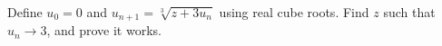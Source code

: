 Define $u_0=0$ and $u_{n+1}=\sqrt[3]{z+3u_n}$ using real cube roots. Find $z$ such that $u_n\to3$, and prove it works.
